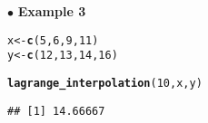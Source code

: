 \documentclass[11pt, a4paper]{article}\usepackage[]{graphicx}\usepackage[]{xcolor}
\makeatletter
\newcommand{\hlnum}[1]{\textcolor[rgb]{0.686,0.059,0.569}{#1}}%
\newcommand{\hldef}[1]{\textcolor[rgb]{0.345,0.345,0.345}{#1}}%
\newcommand{\hlkwb}[1]{\textcolor[rgb]{0.69,0.353,0.396}{#1}}%
\newcommand{\hlkwd}[1]{\textcolor[rgb]{0.737,0.353,0.396}{\textbf{#1}}}%
\newenvironment{kframe}{%
 \def\at@end@of@kframe{}%
 \ifinner\ifhmode%
  \def\at@end@of@kframe{\end{minipage}}%
  \begin{minipage}{\columnwidth}%
 \fi\fi%
 \def\FrameCommand##1{\hskip\@totalleftmargin \hskip-\fboxsep
 \colorbox{shadecolor}{##1}\hskip-\fboxsep
     \hskip-\linewidth \hskip-\@totalleftmargin \hskip\columnwidth}%
 \MakeFramed {\advance\hsize-\width
   \@totalleftmargin\z@ \linewidth\hsize
   \@setminipage}}%
 {\par\unskip\endMakeFramed%
 \at@end@of@kframe}
\newenvironment{knitrout}{}{} %
\makeatother
\begin{document}
$\bullet$ \textbf{Example 3}

\begin{knitrout}
\color{fgcolor}\begin{kframe}
\begin{alltt}
\hldef{x} \hlkwb{<-} \hlkwd{c}\hldef{(}\hlnum{5}\hldef{,} \hlnum{6}\hldef{,} \hlnum{9}\hldef{,} \hlnum{11}\hldef{)}
\hldef{y} \hlkwb{<-} \hlkwd{c}\hldef{(}\hlnum{12}\hldef{,} \hlnum{13}\hldef{,} \hlnum{14}\hldef{,} \hlnum{16}\hldef{)}
\end{alltt}
\end{kframe}
\end{knitrout}

\begin{knitrout}
\color{fgcolor}\begin{kframe}
\begin{alltt}
\hlkwd{lagrange_interpolation}\hldef{(}\hlnum{10}\hldef{, x, y)}
\end{alltt}
\begin{verbatim}
## [1] 14.66667
\end{verbatim}
\end{kframe}
\end{knitrout}
\end{document}

